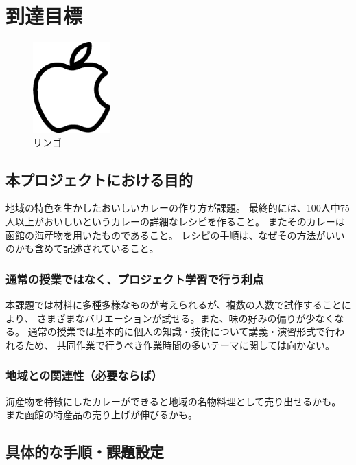 \chapter{到達目標}

\begin{figure}[htbp]
 \centering
 \includegraphics[width=3cm]{images/apple.eps}
 \caption{リンゴ}
 \label{fig:apple}
\end{figure}

\section{本プロジェクトにおける目的}\label{sec:mokuteki}

地域の特色を生かしたおいしいカレーの作り方が課題。
最終的には、100人中75人以上がおいしいというカレーの詳細なレシピを作ること。
またそのカレーは函館の海産物を用いたものであること。
レシピの手順は、なぜその方法がいいのかも含めて記述されていること。

\subsection{通常の授業ではなく、プロジェクト学習で行う利点}

本課題では材料に多種多様なものが考えられるが、複数の人数で試作することにより、 
さまざまなバリエーションが試せる。また、味の好みの偏りが少なくなる。 
通常の授業では基本的に個人の知識・技術について講義・演習形式で行われるため、 
共同作業で行うべき作業時間の多いテーマに関しては向かない。


\subsection{地域との関連性（必要ならば）}

海産物を特徴にしたカレーができると地域の名物料理として売り出せるかも。 
また函館の特産品の売り上げが伸びるかも。



\section{具体的な手順・課題設定}\label{sec:tejun}

